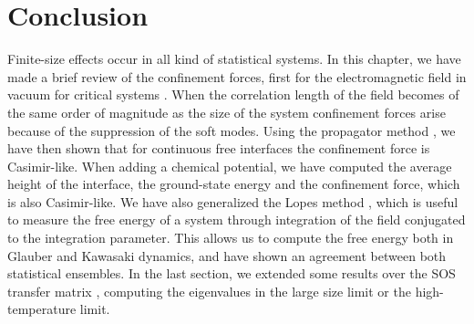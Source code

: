 \section{Conclusion}
{\color{red}
Finite-size effects occur in all kind of statistical systems. In this chapter, we have made a brief review of the confinement forces, first for the electromagnetic field in vacuum \cite{h_b_g_casimir_attraction_1948,boyer_quantum_1968,milton_casimir_1978,bowers_casimir_1998,sm_rytov_principles_1989,lifshits_theory_1955}
for critical systems \cite{gambassi_casimir_2009} . When the correlation length of the field becomes of the same order of magnitude as the size of the system confinement forces arise because of the suppression of the soft modes. 
Using the propagator method \cite{matsubara_new_1955} , we have then shown that for continuous free interfaces the confinement force is Casimir-like. When adding a chemical potential, we have computed the average height of the interface, the ground-state energy and the confinement force, which is also Casimir-like.
We have also generalized the Lopes method \cite{lopes_cardozo_critical_2014} , which is useful to measure the free energy of a system through integration of the field conjugated to the integration parameter. This allows us to compute the free energy both in Glauber and Kawasaki dynamics, and have shown an agreement between both statistical ensembles.
In the last section, we extended some results over the SOS transfer matrix \cite{guyer_sine-gordon_1979,privman_finite-size_1988}, computing the eigenvalues in the large size limit or the high-temperature limit.}